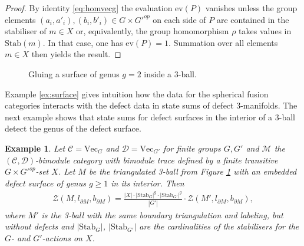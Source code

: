 \documentclass[1.5pt, a4paper]{article}
\newcommand{\mac}{\mathcal C}
\newcommand{\mad}{\mathcal D}
\newcommand{\mam}{\mathcal M}
\newtheorem{example}[theorem]{Example}
\begin{document}
\begin{proof}
By identity \eqref{eq:homvecg} the evaluation  $\mathrm{ev}(P)$ vanishes unless the group elements $(a_i,a'_i), (b_i, b'_i)\in G\times G'^{op}$ on each side of $P$ are contained in the stabiliser  of $m\in X$ or, equivalently, 
the group homomorphism $\rho$ takes values in $\mathrm{Stab}(m)$.
In that case, one has $\mathrm{ev}(P)=1$. 
Summation over all elements $m\in X$ then yields the result. 
\end{proof}



\begin{figure}
\begin{center}
\def\svgwidth{.98\columnwidth}
 
 \end{center}
\caption{Gluing a surface of genus $g=2$ inside a 3-ball.}
 \label{fig:handle}
\end{figure}

Example \ref{ex:surface} gives intuition how the data for the spherical fusion categories interacts with the defect data in state sums of defect 3-manifolds.  The next example shows that  state sums for defect surfaces in the interior of a 3-ball  detect the genus of the defect surface. 



\begin{example} \label{ex:genusg}Let  $\mac=\mathrm{Vec}_G$ and $\mad=\mathrm{Vec}_{G'}$ for finite groups $G,G'$ and
 $\mam$ the $(\mac,\mad)$-bimodule category with bimodule trace  defined by a finite transitive  $G\times G'^{op}$-set $X$. 
 Let $M$ be the triangulated 3-ball from Figure \ref{fig:handle} with an embedded defect surface of genus $g\geq 1$ in its interior. Then 
\begin{align}\label{eq:genussurf}
\mathcal Z(M, l_{\partial M},b_{\partial M})= \frac {|X|\cdot  |\mathrm{Stab}_G|^g\cdot  |\mathrm{Stab}_{G'}|^g}  {|G'|}  \cdot \mathcal Z(M', l_{\partial M}, b_{\partial M}),
\end{align}
where $M'$ is the 3-ball  with the same boundary triangulation and labeling, but without defects and $|\mathrm{Stab}_G|$, $|\mathrm{Stab}_{G'}|$ are the cardinalities of the stabilisers for the $G$- and $G'$-actions on $X$.
\end{example}
\end{document}
